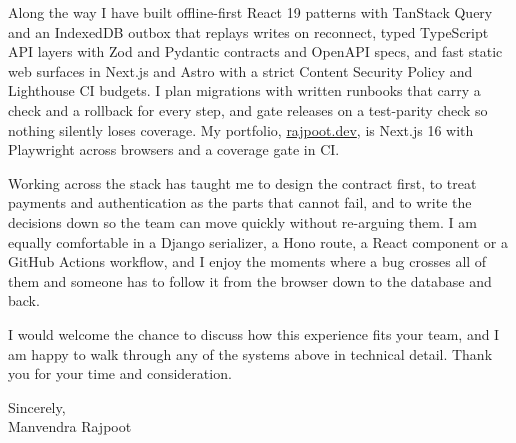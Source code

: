 \documentclass[11pt,a4paper]{article}
\begin{document}
Along the way I have built offline-first React 19 patterns with TanStack Query and
an IndexedDB outbox that replays writes on reconnect, typed TypeScript API layers with
Zod and Pydantic contracts and OpenAPI specs, and fast static web surfaces in Next.js and
Astro with a strict Content Security Policy and Lighthouse CI budgets. I plan migrations
with written runbooks that carry a check and a rollback for every step, and gate releases
on a test-parity check so nothing silently loses coverage. My portfolio,
\href{https://www.rajpoot.dev}{rajpoot.dev}, is Next.js 16 with Playwright across
browsers and a coverage gate in CI.

Working across the stack has taught me to design the contract first, to treat
payments and authentication as the parts that cannot fail, and to write the decisions down
so the team can move quickly without re-arguing them. I am
equally comfortable in a Django serializer, a Hono route, a React component or a GitHub
Actions workflow, and I enjoy the moments where a bug crosses all of them and someone has
to follow it from the browser down to the database and back.

I would welcome the chance to discuss how this experience fits your team, and I am
happy to walk through any of the systems above in technical detail. Thank you for your
time and consideration.


Sincerely,\\[6pt]
Manvendra Rajpoot
\end{document}
